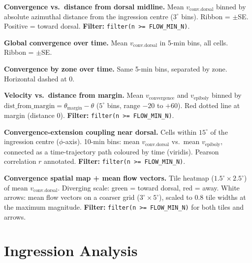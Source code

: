 \documentclass[11pt,a4paper]{article}
\begin{document}
\begin{description}[style=nextline,leftmargin=1.5cm]
  \item[04a] \textbf{Convergence vs.\ distance from dorsal midline.}
    Mean $v_\mathrm{conv.dorsal}$ binned by absolute azimuthal distance from
    the ingression centre ($3^\circ$ bins).  Ribbon = $\pm$SE.
    Positive = toward dorsal.
    \textbf{Filter:} \texttt{filter(n >= FLOW\_MIN\_N)}.

  \item[04b] \textbf{Global convergence over time.}
    Mean $v_\mathrm{conv.dorsal}$ in 5-min bins, all cells.
    Ribbon = $\pm$SE.

  \item[04c] \textbf{Convergence by zone over time.}
    Same 5-min bins, separated by zone. Horizontal dashed at 0.

  \item[04d] \textbf{Velocity vs.\ distance from margin.}
    Mean $v_\mathrm{convergence}$ and $v_\mathrm{epiboly}$ binned by
    $\mathrm{dist\_from\_margin} = \theta_\mathrm{margin} - \theta$
    ($5^\circ$ bins, range $-20$ to $+60$).  Red dotted line at margin
    (distance 0).
    \textbf{Filter:} \texttt{filter(n >= FLOW\_MIN\_N)}.

  \item[04e] \textbf{Convergence-extension coupling near dorsal.}
    Cells within $15^\circ$ of the ingression centre ($\phi$-axis).  10-min
    bins: mean $v_\mathrm{conv.dorsal}$ vs.\ mean $v_\mathrm{epiboly}$,
    connected as a time-trajectory path coloured by time (viridis).
    Pearson correlation $r$ annotated.
    \textbf{Filter:} \texttt{filter(n >= FLOW\_MIN\_N)}.

  \item[04f] \textbf{Convergence spatial map + mean flow vectors.}
    Tile heatmap ($1.5^\circ \times 2.5^\circ$) of mean
    $v_\mathrm{conv.dorsal}$.  Diverging scale: green = toward dorsal,
    red = away.  White arrows: mean flow vectors on a coarser grid
    ($3^\circ \times 5^\circ$), scaled to 0.8 tile widths at the maximum
    magnitude.
    \textbf{Filter:} \texttt{filter(n >= FLOW\_MIN\_N)} for both tiles
    and arrows.
\end{description}


\section{Ingression Analysis}
\label{fig:ingression}
\end{document}
